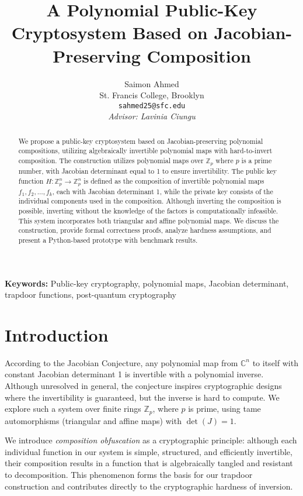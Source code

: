 \documentclass[12pt]{article}
\title{
A Polynomial Public-Key Cryptosystem Based on Jacobian-Preserving Composition
}
\author{
Saimon Ahmed \\
St. Francis College, Brooklyn \\
\texttt{sahmed25@sfc.edu} \\
\smallskip
\textit{Advisor: Lavinia Ciungu}
}
\begin{document}
\maketitle
\begin{abstract}
We propose a public-key cryptosystem based on Jacobian-preserving polynomial compositions, utilizing algebraically invertible polynomial maps with hard-to-invert composition. The construction utilizes polynomial maps over $\mathbb{Z}_p$ where $p$ is a prime number, with Jacobian determinant equal to 1 to ensure invertibility. The public key function $H : \mathbb{Z}_p^n \rightarrow \mathbb{Z}_p^n$ is defined as the composition of invertible polynomial maps $f_1, f_2, \dots, f_k$, each with Jacobian determinant 1, while the private key consists of the individual components used in the composition. Although inverting the composition is possible, inverting without the knowledge of the factors is computationally infeasible. This system incorporates both triangular and affine polynomial maps. We discuss the construction, provide formal correctness proofs, analyze hardness assumptions, and present a Python-based prototype with benchmark results.
\end{abstract}



\vspace{0.5em}
\noindent\textbf{Keywords:} Public-key cryptography, polynomial maps, Jacobian determinant, trapdoor functions, post-quantum cryptography


\vspace{1.5em}


\section{Introduction}
According to the Jacobian Conjecture, any polynomial map from \( \mathbb{C}^n \) to itself with constant Jacobian determinant 1 is invertible with a polynomial inverse. Although unresolved in general, the conjecture inspires cryptographic designs where the invertibility is guaranteed, but the inverse is hard to compute. We explore such a system over finite rings \( \mathbb{Z}_p \), where \( p \) is prime, using tame automorphisms (triangular and affine maps) with \( \det(J) = 1 \).


We introduce \textit{composition obfuscation} as a cryptographic principle: although each individual function in our system is simple, structured, and efficiently invertible, their composition results in a function that is algebraically tangled and resistant to decomposition. This phenomenon forms the basis for our trapdoor construction and contributes directly to the cryptographic hardness of inversion.
\end{document}
